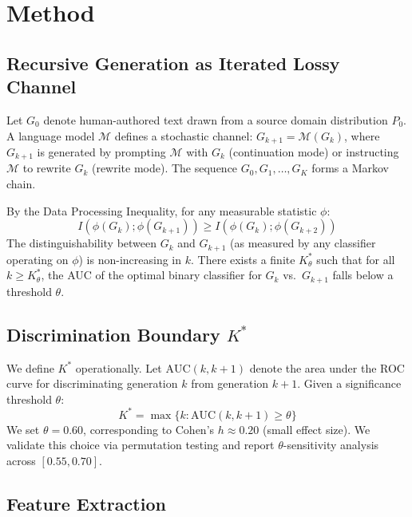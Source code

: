 \documentclass[11pt,a4paper]{article}
\begin{document}
\section{Method}
\label{sec:method}

\subsection{Recursive Generation as Iterated Lossy Channel}

Let $G_0$ denote human-authored text drawn from a source domain distribution $P_0$. A language model $\mathcal{M}$ defines a stochastic channel: $G_{k+1} = \mathcal{M}(G_k)$, where $G_{k+1}$ is generated by prompting $\mathcal{M}$ with $G_k$ (continuation mode) or instructing $\mathcal{M}$ to rewrite $G_k$ (rewrite mode). The sequence $G_0, G_1, \ldots, G_K$ forms a Markov chain.

By the Data Processing Inequality, for any measurable statistic $\phi$:
\begin{equation}
    I(\phi(G_k); \phi(G_{k+1})) \geq I(\phi(G_k); \phi(G_{k+2}))
\end{equation}
The distinguishability between $G_k$ and $G_{k+1}$ (as measured by any classifier operating on $\phi$) is non-increasing in $k$. There exists a finite $K^*_\theta$ such that for all $k \geq K^*_\theta$, the AUC of the optimal binary classifier for $G_k$ vs.\ $G_{k+1}$ falls below a threshold $\theta$.

\subsection{Discrimination Boundary $K^*$}

We define $K^*$ operationally. Let $\text{AUC}(k, k\!+\!1)$ denote the area under the ROC curve for discriminating generation $k$ from generation $k\!+\!1$. Given a significance threshold $\theta$:
\begin{equation}
    K^* = \max\{k : \text{AUC}(k, k\!+\!1) \geq \theta\}
\end{equation}
We set $\theta = 0.60$, corresponding to Cohen's $h \approx 0.20$ (small effect size). We validate this choice via permutation testing and report $\theta$-sensitivity analysis across $[0.55, 0.70]$.

\subsection{Feature Extraction}
\end{document}
